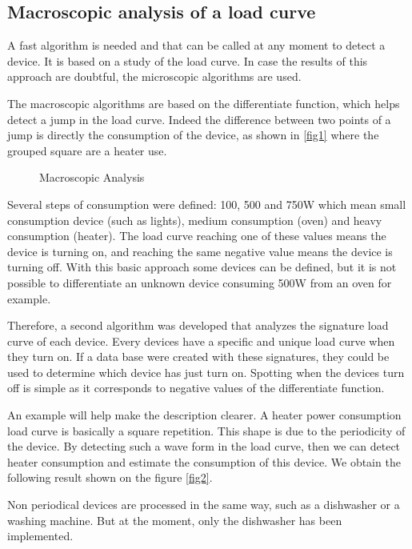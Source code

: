 \subsection{Macroscopic analysis of a load curve}
A fast algorithm is needed and that can be called at any moment to detect a device. It is based on a study of the load curve. In case the results of this approach are doubtful, the microscopic algorithms are used.

The macroscopic algorithms are based on the differentiate function, which helps detect a jump in the load curve. Indeed the difference between two points of a jump is directly the consumption of the device, as shown in \ref{fig1} where the grouped square are a heater use.


\begin{figure}[h]
 \begin{center}
   \caption{Macroscopic Analysis}
   \label{fig-1-1-2}
 \end{center}
\end{figure}

Several steps of consumption were defined: 100, 500 and 750W which mean small consumption device (such as lights), medium consumption (oven) and heavy consumption (heater). The load curve reaching one of these values means the device is turning on, and reaching the same negative value means the device is turning off. With this basic approach some devices can be defined, but it is not possible to differentiate an unknown device consuming 500W from an oven for example.

Therefore, a second algorithm was developed that analyzes the signature load curve of each device. Every devices have a specific and unique load curve when they turn on. If a data base were created with these signatures, they could be used to determine which device has just turn on. Spotting when the devices turn off is simple as it corresponds to negative values of the differentiate function.

An example will help make the description clearer. A heater power consumption load curve is basically a square repetition. This shape is due to the periodicity of the device. By detecting such a wave form in the load curve, then we can detect heater consumption and estimate the consumption of this device. We obtain the following result shown on the figure \ref{fig2}.


Non periodical devices are processed in the same way, such as a dishwasher or a washing machine. But at the moment, only the dishwasher has been implemented.


